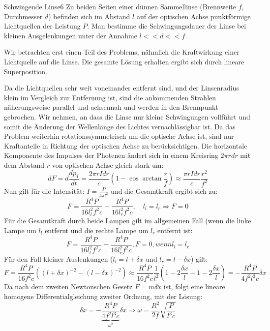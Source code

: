 \begin{problem}{Schwingende Linse}{6}
Zu beiden Seiten einer dünnen Sammellinse (Brennweite $f$, Durchmesser $d$) befinden sich im Abstand $l$ auf der optischen Achse punktförmige Lichtquellen der Leistung $P$. Man bestimme die Schwingungsdauer der Linse bei kleinen Ausgelenkungen unter der Annahme $l<<d<<f$.
\begin{solution}
Wir betrachten erst einen Teil des Problems, nähmlich die Kraftwirkung einer Lichtquelle auf die Linse. Die gesamte Lösung erhalten ergibt sich durch lineare Superposition.
 
Da die Lichtquellen sehr weit voneinander entfernt sind, und der Linsenradius klein im Vergleich zur Entfernung ist, sind die ankommenden Strahlen näherungsweise parallel und achsennah und werden in den Brennpunkt gebrochen. Wir nehmen, an dass die Linse nur kleine Schwingungen vollführt und somit die Änderung der Wellenlänge des Lichtes vernachlässigbar ist. Da das Problem weiterhin rotationssymmetrisch um die optische Achse ist, sind nur Kraftanteile in Richtung der optischen Achse zu berücksichtigen. Die horizontale Komponente des Impulses der Photenen ändert sich in einem Kreisring $2\pi r dr$ mit dem Abstand $r$ von optischen Achse gleich stark um:
$$dF=d\frac{dp_I}{dt}=\frac{2\pi rIdr}{c}(1-\cos{\arctan\frac{r}{f}})\approx\frac{\pi rIdr}{c}\frac{r^2}{f^2}$$
Nun gilt für die Intensität: $I=\frac{P}{4\pi l^2}$ und die Gesamtkraft ergibt sich zu:
$$F=\frac{R^4P}{16l_l^2f^2c}-\frac{R^4P}{16l_r^2f^2c},\quad l_l=l_r \Rightarrow F=0$$
Für die Gesamtkraft durch beide Lampen gilt im allgemeinen Fall (wenn die linke Lampe um $l_l$ entfernt und die rechte Lampe um $l_r$ entfernt ist:
$$F=\frac{R^4P}{16l_l^2f^2c}-\frac{R^4P}{16l_r^2f^2c}, F=0, wenn l_l=l_r$$
Für den Fall kleiner Auslenkungen ($l_l=l+\delta x$ und $l_r=l-\delta x$) gilt:
$$F=\frac{R^4P}{16f^2c}\left((l+\delta x)^{-2}-(l-\delta x)^{-2}\right)\approx \frac{R^4P}{16f^2c}\frac 1{l^2}(1-2\frac{\delta x}l-1-2\frac{\delta x}l)=-\frac{R^4P}{4f^2l^3c}\delta x$$
Da nach dem zweiten Newtonschen Gesetz $F=m\delta\ddot{x}$ ist, folgt eine lineare homogene Differentialgleichung zweiter Ordnung, mit der Lösung:
$$\delta \ddot{x}=-\underbrace{\frac{R^4P}{4f^2l^3c}}_{\omega^2}\delta x \Rightarrow \omega=\frac{R^2}{2f}\sqrt{\frac{P}{l^3c}}$$
\end{solution}
\end{problem}

